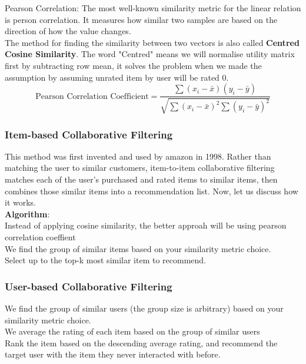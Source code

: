 Pearson Correlation: The most well-known similarity metric for the linear relation is person correlation. It measures how similar two samples are based on the direction of how the value changes.
\\The method for finding the similarity between two vectors is also called \textbf{Centred Cosine Similarity}. The word "Centred" means we will normalise utility matrix first by subtracting row mean, it solves the problem when we made the assumption by assuming unrated item by user will be rated 0. 
\begin{equation*}
\text{Pearson Correlation Coefficient} = \frac{\sum(x_{i} - \bar{x})(y_{i} - \bar{y})} {\sqrt{\sum(x_{i} - \bar{x})^{2} \sum{(y_{i} - \bar{y})^{2} }}}
\end{equation*}


\subsubsection{Item-based Collaborative Filtering}
This method was first invented and used by amazon in 1998. 
Rather than matching the user to similar customers, item-to-item collaborative filtering matches each of the user’s purchased and rated items to similar items, then combines those similar items into a recommendation list. Now, let us discuss how it works.
\\ \textbf{Algorithm}:
\\Instead of applying cosine similarity, the better approah will be using pearson correlation coeffient
\\We find the group of similar items based on your similarity metric choice.
\\Select up to the top-k most similar item to recommend.


\subsubsection{User-based Collaborative Filtering}
We find the group of similar users (the group size is arbitrary) based on your similarity metric choice.
\\We average the rating of each item based on the group of similar users
\\Rank the item based on the descending average rating, and recommend the target user with the item they never interacted with before.







